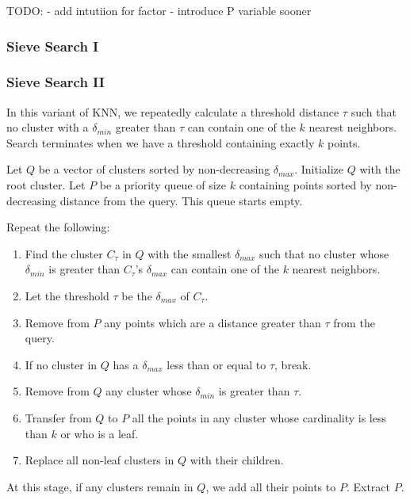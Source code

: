 TODO: 
- add intutiion for factor 
- introduce P variable sooner 

\subsubsection{Sieve Search I}
\label{subsubsec:methods:knn-search:sieve}

\subsubsection{Sieve Search II}

In this variant of KNN, we repeatedly calculate a threshold distance $\tau$ such that no cluster with a $\delta_{min}$ greater than $\tau$ 
can contain one of the $k$ nearest neighbors. Search terminates when we have a threshold containing exactly $k$ points.

Let $Q$ be a vector of clusters sorted by non-decreasing $\delta_{max}$. Initialize $Q$ with  
the root cluster. 
Let $P$ be a priority queue of size $k$ containing points sorted by non-decreasing distance from the query. This queue starts empty.


Repeat the following: 
\begin{enumerate}
\item Find the cluster $C_{\tau}$ in $Q$ with the smallest $\delta_{max}$ such that no cluster whose $\delta_{min}$ is greater than $C_{\tau}$'s $\delta_{max}$ can contain one of the $k$ nearest neighbors.
\item Let the threshold $\tau$ be the $\delta_{max}$ of $C_{\tau}$.
\item Remove from $P$ any points which are a distance greater than $\tau$ from the query. 
\item If no cluster in $Q$ has a $\delta_{max}$ less than or equal to $\tau$, break.
\item Remove from $Q$ any cluster whose $\delta_{min}$ is greater than $\tau$.
\item Transfer from $Q$ to $P$ all the points in any cluster whose cardinality is less than $k$ or who is a leaf. 
\item Replace all non-leaf clusters in $Q$ with their children. 
\end{enumerate}

At this stage, if any clusters remain in $Q$, we add all their points to $P$. 
Extract $P$. 

